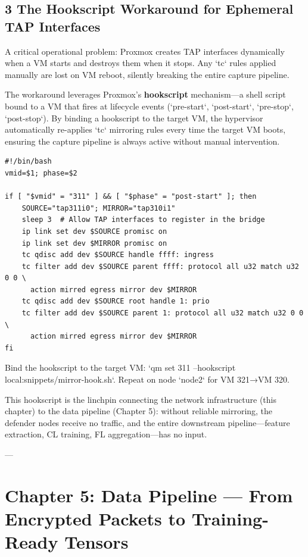 \documentclass[conference]{IEEEtran}
\begin{document}
\subsection{3 The Hookscript Workaround for Ephemeral TAP Interfaces}

A critical operational problem: Proxmox creates TAP interfaces dynamically when a VM starts and destroys them when it stops. Any `tc` rules applied manually are lost on VM reboot, silently breaking the entire capture pipeline.

The workaround leverages Proxmox's \textbf{hookscript} mechanism—a shell script bound to a VM that fires at lifecycle events (`pre-start`, `post-start`, `pre-stop`, `post-stop`). By binding a hookscript to the target VM, the hypervisor automatically re-applies `tc` mirroring rules every time the target VM boots, ensuring the capture pipeline is always active without manual intervention.

\begin{verbatim}
#!/bin/bash
vmid=$1; phase=$2

if [ "$vmid" = "311" ] && [ "$phase" = "post-start" ]; then
    SOURCE="tap311i0"; MIRROR="tap310i1"
    sleep 3  # Allow TAP interfaces to register in the bridge
    ip link set dev $SOURCE promisc on
    ip link set dev $MIRROR promisc on
    tc qdisc add dev $SOURCE handle ffff: ingress
    tc filter add dev $SOURCE parent ffff: protocol all u32 match u32 0 0 \
      action mirred egress mirror dev $MIRROR
    tc qdisc add dev $SOURCE root handle 1: prio
    tc filter add dev $SOURCE parent 1: protocol all u32 match u32 0 0 \
      action mirred egress mirror dev $MIRROR
fi
\end{verbatim}

Bind the hookscript to the target VM: `qm set 311 --hookscript local:snippets/mirror-hook.sh`. Repeat on node `node2` for VM 321→VM 320.

This hookscript is the linchpin connecting the network infrastructure (this chapter) to the data pipeline (Chapter 5): without reliable mirroring, the defender nodes receive no traffic, and the entire downstream pipeline—feature extraction, CL training, FL aggregation—has no input.

---


\section{Chapter 5: Data Pipeline — From Encrypted Packets to Training-Ready Tensors}
\end{document}
